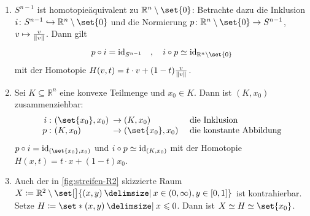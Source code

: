 \begin{beispiel}[{name=[Homotopieäquivalenzen]}]
	\begin{enumerate}[(1)]
		\item $S^{n-1}$ ist homotopieäquivalent zu $\mathbb{R}^n \setminus \set{0}$: 
		Betrachte dazu die Inklusion $i \colon S^{n-1} \hookrightarrow \mathbb{R}^n \setminus \set{0}$ und
		die Normierung $p \colon \mathbb{R}^n \setminus \set{0} \to S^{n-1}$, $v \mapsto \frac{v}{\Vert v\Vert}$. 
		Dann gilt
		\[
			p \circ i = \id_{S^{n-1}} \quad , \quad i \circ p  \simeq \id_{\mathbb{R}^{n} \setminus \set{0} }
		\]
		mit der Homotopie $H(v,t)= t \cdot v + (1-t) \frac{v}{\Vert v\Vert}$.
		\item Sei $K \subseteq \mathbb{R}^n$ eine konvexe Teilmenge und $x_0 \in K$. 
		Dann ist $(K,x_0)$ zusammenziehbar:
		\[
			\begin{array}{r@{\,}l@{}ll}
				i &\colon \enbrace*{\set{x_0}, x_0 }\enspace &\to  (K,x_0) \qquad  &\text{ die Inklusion}\\
				p &\colon \enbrace*{K, x_0} &\to \enbrace*{\set{x_0}, x_0 }  &\text{ die konstante Abbildung}
			\end{array}
		\]
		$p \circ i = \id_{\enbrace*{\set{x_0}, x_0}}$ und $i \circ p \simeq \operatorname{id}_{(K,x_0)}$ mit der Homotopie $H(x,t)= t \cdot x + (1-t)x_0$.
		\item Auch der in \cref{fig:streifen-R2} skizzierte Raum $X \coloneqq \mathbb{R}^2 \setminus \set[\big]{(x,y) \given x \in (0,\infty) , y \in [0,1]} $ ist kontrahierbar.
		Setze $H \coloneqq \set*{(x,y) \given x \le 0} $. 
		Dann ist $X \simeq H \simeq \set{x_0}$.
		\begin{figure}[tbhp]
		\end{figure}
	\end{enumerate}
\end{beispiel}

